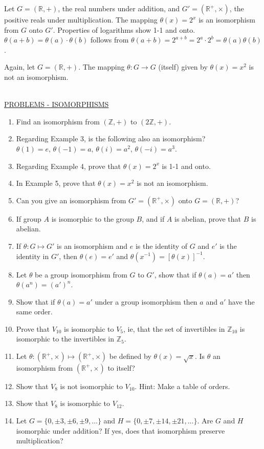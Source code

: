 \documentclass[12pt]{book}
\theoremstyle{definition}
\def\Z{\mathbb{Z}}
\begin{document}
\begin{tcexample}{}{}
 Let $G=(\mathbb{R},+)$, the real numbers under addition, and $G'=(\mathbb{R}^+,\times)$, the positive reals under multiplication.  The mapping $\theta(x)=2^x$ is an isomorphism from $G$ onto $G'$.  Properties of logarithms show 1-1 and onto.  $\theta(a+b)=\theta(a)\cdot\theta(b)$ follows from $\theta(a+b)=2^{a+b}=2^a\cdot2^b = \theta(a)\theta(b)$.
\end{tcexample}

\begin{tcexample}{}{}
 Again, let $G=(\mathbb{R},+)$. The mapping $\theta:G\rightarrow G$ (itself) given by $\theta(x)=x^2$ is not an isomorphism.
\end{tcexample}
~\\[.2in]
\underline{PROBLEMS - ISOMORPHISMS}
\begin{enumerate}
\item Find an isomorphism from $(\Z,+)$ to $(2\Z,+)$.
\item Regarding Example 3, is the following also an isomorphism? $\theta(1)=e,\, \theta(-1)=a,\, \theta(i)=a^2,\, \theta(-i)=a^3$.
\item Regarding Example 4, prove that $\theta(x)=2^x$ is 1-1 and onto.
\item In Example 5, prove that $\theta(x)=x^2$ is not an isomorphism.
\item Can you give an isomorphism from $G'=(\mathbb{R}^+,\times)$ onto $G=(\mathbb{R},+)$?
\item If group $A$ is isomorphic to the group $B$, and if $A$ is abelian, prove that $B$ is abelian.
\item If $\theta:G\mapsto G'$ is an isomorphism and $e$ is the identity of $G$ and $e'$ is the identity in $G'$, then $\theta(e)=e'$ and $\theta(x^{-1})=[\theta(x)]^{-1}$.
\item Let $\theta$ be a group isomorphism from $G$ to $G'$, show that if $\theta(a)=a'$ then $\theta(a^n)=(a')^n$.
\item Show that if $\theta(a)=a'$ under a group isomorphism then $a$ and $a'$ have the same order.
\item Prove that $V_{10}$ is isomorphic to $V_5$, ie, that the set of invertibles in $\Z_{10}$ is isomorphic to the invertibles in $\Z_5$.
\item Let $\theta:(\mathbb{R}^+,\times)\mapsto(\mathbb{R}^+,\times)$ be defined by $\theta(x)=\sqrt x$.  Is $\theta$ an isomorphism from $(\mathbb{R}^+,\times)$ to itself?
\item Show that $V_8$ is not isomorphic to $V_{10}$.  Hint: Make a table of orders.
\item Show that $V_8$ is isomorphic to $V_{12}$.
\item Let $G=\{0,\pm3,\pm6, \pm9,\dots\}$ and $H=\{0,\pm7,\pm14,\pm21,\dots\}$.  Are $G$ and $H$ isomorphic under addition?  If yes, does that isomorphism preserve multiplication?



\end{enumerate}
\end{document}
